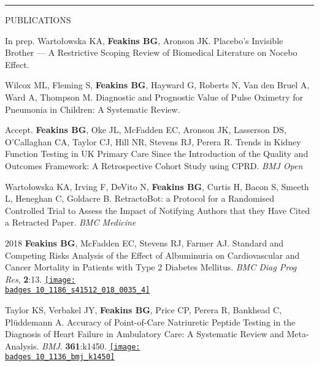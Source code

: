 \documentclass[10pt,a4paper]{article}
\def\badges{./badges/}
\begin{document}
\noindent\rule{\textwidth}{0.4pt}
\begin{cvlist}{PUBLICATIONS}
  
  \item[In prep.]
  Warto\l{}owska KA, \textbf{Feakins BG}, Aronson JK. Placebo’s Invisible Brother --- A Restrictive Scoping Review of Biomedical Literature on Nocebo Effect.
  
  \item[]
  Wilcox ML, Fleming S, \textbf{Feakins BG}, Hayward G, Roberts N, Van den Bruel A, Ward A, Thompson M. Diagnostic and Prognostic Value of Pulse Oximetry for Pneumonia in Children: A Systematic Review.
  
  \item[Accept.]
  \textbf{Feakins BG}, Oke JL, McFadden EC, Aronson JK, Lasserson DS, O'Callaghan CA, Taylor CJ, Hill NR, Stevens RJ, Perera R. Trends in Kidney Function Testing in UK Primary Care Since the Introduction of the Quality and Outcomes Framework: A Retrospective Cohort Study using CPRD. \textit{BMJ Open}
  
  \item[]
  Warto\l{}owska KA, Irving F, DeVito N, \textbf{Feakins BG}, Curtis H, Bacon S, Smeeth L, Heneghan C, Goldacre B. RetractoBot: a Protocol for a Randomised Controlled Trial to Assess the Impact of Notifying Authors that they Have Cited a Retracted Paper. \textit{BMC Medicine} 
  
  \item[2018]
  \textbf{Feakins BG}, McFadden EC, Stevens RJ, Farmer AJ. Standard and Competing Risks Analysis of the Effect of Albuminuria on Cardiovascular and Cancer Mortality in Patients with Type 2 Diabetes Mellitus. \textit{BMC Diag Prog Res}, \textbf{2}:13.  \href{https://biomedcentral.altmetric.com/details/45475518}{\texttt{[image: \\badges 10\_1186\_s41512\_018\_0035\_4]}}
  
  \item[]
  Taylor KS, Verbakel JY, \textbf{Feakins BG}, Price CP, Perera R, Bankhead C, Pl\"uddemann A. Accuracy of Point-of-Care Natriuretic Peptide Testing in the Diagnosis of Heart Failure in Ambulatory Care: A Systematic Review and Meta-Analysis. \textit{BMJ}. \textbf{361}:k1450.  \href{https://bmj.altmetric.com/details/42193657}{\texttt{[image: \\badges 10\_1136\_bmj\_k1450]}}
  

\end{cvlist}
\end{document}
